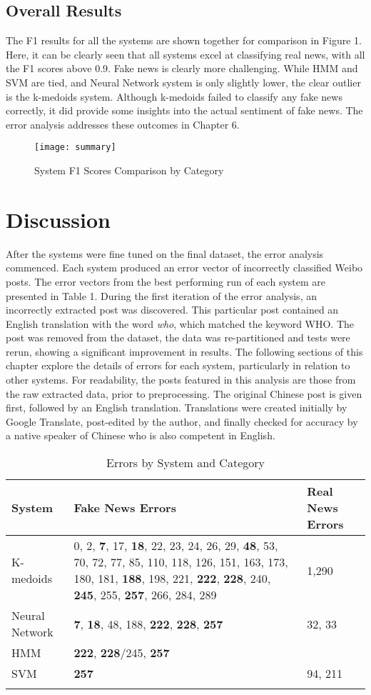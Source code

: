 \documentclass [11pt, proquest] {uwthesis}[2020/02/24]
\begin{document}
\section{Overall Results}
The F1 results for all the systems are shown together for comparison in Figure 1. Here, it can be clearly seen that all systems excel at classifying real news, with all the F1 scores above 0.9. Fake news is clearly more challenging. While HMM and SVM are tied, and Neural Network system is only slightly lower, the clear outlier is the k-medoids system. Although k-medoids failed to classify any fake news correctly, it did provide some insights into the actual sentiment of fake news. The error analysis addresses these outcomes in Chapter 6.
\begin{figure}[hbt!]
\begin{center}
\texttt{[image: summary]}
\end{center}
\caption{System F1 Scores Comparison by Category}
\end{figure}

\chapter{Discussion}

After the systems were fine tuned on the final dataset, the error analysis commenced. Each system produced an error vector of incorrectly classified Weibo posts. The error vectors from the best performing run of each system are presented in Table 1. 
During the first iteration of the error analysis, an incorrectly extracted post was discovered. This particular post contained an English translation with the word \textit{who}, which matched the keyword WHO. The post was removed from the dataset, the data was re-partitioned and tests were rerun, showing a significant improvement in results. The following sections of this chapter explore the details of errors for each system, particularly in relation to other systems. For readability, the posts featured in this analysis are those from the raw extracted data, prior to preprocessing. The original Chinese post is given first, followed by an English translation. Translations were created initially by Google Translate, post-edited by the author, and finally checked for accuracy by a native speaker of Chinese who is also competent in English. 
\begin{longtable}{p{3cm}p{9cm}p{3.5cm}}
 System&Fake News Errors&Real News Errors\\
 \hline
 K-medoids&0, 2, \textbf{7}, 17,  \textbf{18}, 22, 23, 24, 26, 29,  \textbf{48}, 53, 70, 72, 77, 85, 110, 118, 126, 151, 163, 173, 180, 181, \textbf{188}, 198, 221,  \textbf{222},  \textbf{228}, 240,  \textbf{245}, 255,  \textbf{257}, 266, 284, 289&1,290\\
 Neural Network&\textbf{7}, \textbf{18}, 48, 188, \textbf{222}, \textbf{228}, \textbf{257}&32, 33\\
 HMM&\textbf{222}, \textbf{228}/245, \textbf{257}&\\
 SVM&\textbf{257}&94, 211\\
 \hline
\caption{Errors by System and Category}
\end{longtable}
\end{document}
